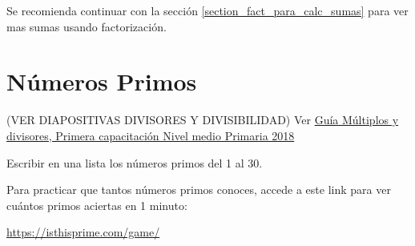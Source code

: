 \begin{tcolorbox}[colback=white!5!white,colframe=green!50!black]
	Se recomienda continuar con la sección \ref{section_fact_para_calc_sumas} para ver mas sumas usando factorización.
\end{tcolorbox}

\chapter{Números Primos}
(VER DIAPOSITIVAS DIVISORES Y DIVISIBILIDAD)
Ver  \href{run:TN/Anexos/Primaria_2018_CAP1_medio_Multiplos_y_divisores_y_MCD_y_MCM.pdf}{Guía Múltiplos y divisores, Primera capacitación Nivel medio Primaria 2018}

\begin{exer}
	Escribir en una lista los números primos del 1 al 30.
\end{exer}

\begin{tcolorbox}[colback=black!5!white,colframe=black]
	Para practicar que tantos números primos conoces, accede a este link para ver cuántos primos aciertas en 1 minuto:
	
	\centering
	\url{https://isthisprime.com/game/}
\end{tcolorbox}

